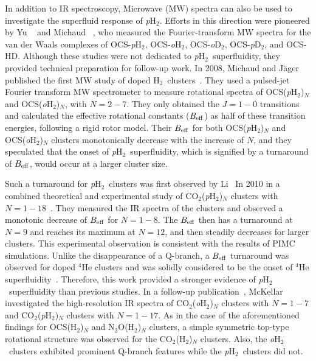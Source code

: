\documentclass[12pt]{iopart}
\newcommand{\odtwo}{{\em o}D$_2$}
\newcommand{\hydrogen}{H$_2$}
\newcommand{\phtwo}{{\em p}H$_2$}
\newcommand{\ohtwo}{{\em o}H$_2$}
\newcommand{\pdtwo}{{\em p}D$_2$}
\begin{document}
In addition to IR spectroscopy, Microwave (MW) spectra can also be used to investigate the superfluid response of  \phtwo. 
Efforts in this direction were pioneered by Yu \etal~\cite{yu_ocs_h2_1,yu_ocs_h2_2} and Michaud \etal~\cite{michaud_ocs_h2_1}, who measured the Fourier-transform MW spectra for the van der Waals complexes of OCS-\phtwo, OCS-\ohtwo, OCS-\odtwo, OCS-\pdtwo, and OCS-HD. 
Although these studies were not dedicated to \phtwo~superfluidity, they provided technical preparation for follow-up work. 
In 2008, Michaud and J\"ager published the first MW study of doped \hydrogen~clusters~\cite{michaud_ocs_h2_2}. 
They used a pulsed-jet Fourier transform MW spectrometer to measure rotational spectra of OCS(\phtwo)$_N$ and OCS(\ohtwo)$_N$, with $N=2-7$. 
They only obtained the $J=1-0$ transitions and calculated the effective rotational constants ($B_{\rm eff}$) as half of these transition energies, 
following a rigid rotor model. 
Their $B_{\rm eff}$ for both OCS(\phtwo)$_N$ and OCS(\ohtwo)$_N$ clusters monotonically decrease with the increase of $N$, and they speculated that the onset of \phtwo~superfluidity, which is signified by a turnaround of $B_{\rm eff}$, would occur at a larger cluster size.

Such a turnaround for \phtwo~clusters was first observed by Li \etal~In 2010 in a combined theoretical and experimental study of CO$_2$(\phtwo)$_N$ clusters with $N=1-18$~\cite{huili_prl}. 
They measured the IR spectra of the clusters and observed a monotonic decrease of $B_{\rm eff}$ for $N=1-8$. 
The $B_{\rm eff}$ then has a turnaround at $N=9$ and reaches its maximum at $N=12$, and then steadily decreases for larger  clusters. 
This experimental observation is consistent  with the results of PIMC simulations. 
Unlike the disappearance of a Q-branch, a $B_{\rm eff}$ turnaround was observed for doped $^4$He clusters and was solidly considered to be the onset of $^4$He superfluidity~\cite{xu_turnaround_1,moroni_pn_pimc,xu_turnaround_2}. 
Therefore, this work provided a stronger evidence of \phtwo~superfluidity than previous studies. 
In a follow-up publication~\cite{mckellar_co2_h2}, McKellar investigated the high-resolution IR spectra of CO$_2$(\ohtwo)$_N$ clusters with $N=1-7$ and CO$_2$(\phtwo)$_N$ clusters with $N=1-17$. 
As in the case of the aforementioned findings for OCS(\hydrogen)$_N$ and N$_2$O(\hydrogen)$_N$ clusters, a simple symmetric top-type rotational structure was observed for the CO$_2$(\hydrogen)$_N$ clusters. 
Also, the \ohtwo~clusters exhibited prominent Q-branch features while the \phtwo~clusters did not.
\end{document}
